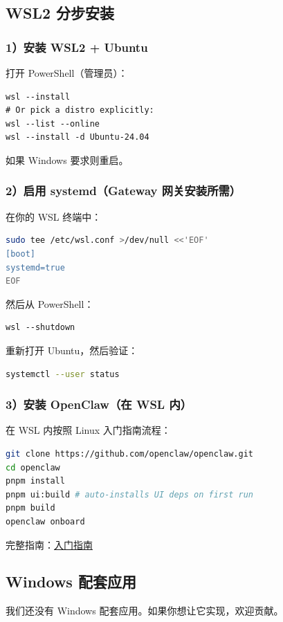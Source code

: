 \subsection{WSL2 分步安装}


\subsubsection{1）安装 WSL2 + Ubuntu}


打开 PowerShell（管理员）：

\begin{lstlisting}
wsl --install
# Or pick a distro explicitly:
wsl --list --online
wsl --install -d Ubuntu-24.04
\end{lstlisting}


如果 Windows 要求则重启。

\subsubsection{2）启用 systemd（Gateway 网关安装所需）}


在你的 WSL 终端中：

\begin{lstlisting}[language=bash]
sudo tee /etc/wsl.conf >/dev/null <<'EOF'
[boot]
systemd=true
EOF
\end{lstlisting}


然后从 PowerShell：

\begin{lstlisting}
wsl --shutdown
\end{lstlisting}


重新打开 Ubuntu，然后验证：

\begin{lstlisting}[language=bash]
systemctl --user status
\end{lstlisting}


\subsubsection{3）安装 OpenClaw（在 WSL 内）}


在 WSL 内按照 Linux 入门指南流程：

\begin{lstlisting}[language=bash]
git clone https://github.com/openclaw/openclaw.git
cd openclaw
pnpm install
pnpm ui:build # auto-installs UI deps on first run
pnpm build
openclaw onboard
\end{lstlisting}


完整指南：\href{/start/getting-started}{入门指南}

\subsection{Windows 配套应用}


我们还没有 Windows 配套应用。如果你想让它实现，欢迎贡献。


\clearpage
